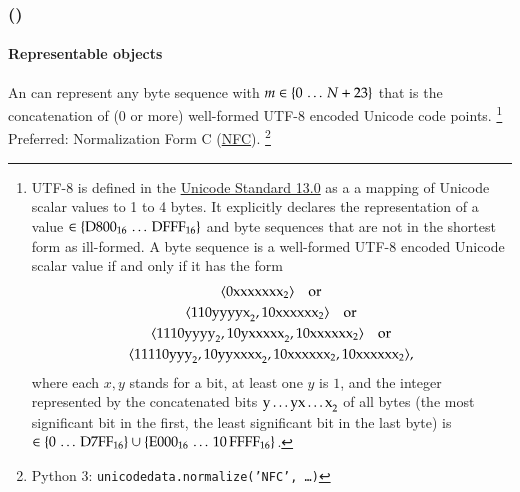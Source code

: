 \subsubsection{\DborUtfEightStringValue(\texorpdfstring{}{<b1, ..., bm>})}
\hypertarget{sec:def:Utf8StringValue}{}

\paragraph{Representable objects}

An \DborUtfEightStringValue{} can represent any byte sequence 
with $m \in \{0 \,\ldots\, N + 23\}$ that is the concatenation of ($0$ or more)
well-formed UTF-8 encoded Unicode code points.%
\footnote{
    UTF-8 is defined in the
    \href{https://www.unicode.org/versions/Unicode13.0.0/ch03.pdf\#G31703}{Unicode Standard 13.0}
    as a a mapping of Unicode scalar values to 1 to 4 bytes.
    It explicitly declares the representation of a value $\in \{\mathrm{D800}_{16} \,\ldots\, \mathrm{DFFF}_{16}\}$
    and byte sequences that are not in the shortest form as ill-formed.
    A byte sequence  is a well-formed UTF-8 encoded Unicode scalar value if and
    only if it has the form
    \begin{gather*}
        \langle \mathrm{0xxxxxxx}_{2} \rangle \quad\text{or} \\
        \langle \mathrm{110yyyyx}_{2}, \mathrm{10xxxxxx}_{2} \rangle \quad\text{or} \\
        \langle \mathrm{1110yyyy}_{2}, \mathrm{10yxxxxx}_{2}, \mathrm{10xxxxxx}_{2} \rangle \quad\text{or} \\
        \langle \mathrm{11110yyy}_{2}, \mathrm{10yyxxxx}_{2}, \mathrm{10xxxxxx}_{2}, \mathrm{10xxxxxx}_{2} \rangle,
    \end{gather*}
    where each $x, y$ stands for a bit, at least one $y$ is $1$, and the integer represented by
    the concatenated bits $\mathrm{y \ldots y x \ldots x}_{2}$ of all bytes
    (the most significant bit in the first, the least significant bit in the last byte) is
    $\in \{0 \,\ldots\, \mathrm{D7FF}_{16}\} \cup \{\mathrm{E000}_{16} \,\ldots\, \mathrm{10\,FFFF}_{16}\}$.
}
Preferred: Normalization Form C (\href{https://www.unicode.org/versions/Unicode13.0.0/ch03.pdf\#G31703}{NFC}).%
\footnote{
    Python 3: \texttt{unicodedata.normalize('NFC', \dots)}
}


